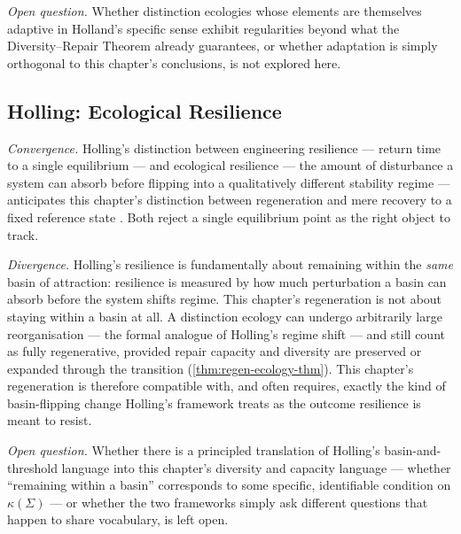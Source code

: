 \documentclass[12pt,twoside,openright]{book}
\begin{document}
\emph{Open question.} Whether distinction ecologies whose
elements are themselves adaptive in Holland's specific sense
exhibit regularities beyond what the Diversity--Repair Theorem
already guarantees, or whether adaptation is simply orthogonal
to this chapter's conclusions, is not explored here.

\subsection*{Holling: Ecological Resilience}

\emph{Convergence.} Holling's distinction between engineering
resilience --- return time to a single equilibrium --- and
ecological resilience --- the amount of disturbance a system
can absorb before flipping into a qualitatively different
stability regime --- anticipates this chapter's distinction
between regeneration and mere recovery to a fixed reference
state \parencite{holling1973}. Both reject a single equilibrium
point as the right object to track.

\emph{Divergence.} Holling's resilience is fundamentally about
remaining within the \emph{same} basin of attraction: resilience
is measured by how much perturbation a basin can absorb before
the system shifts regime. This chapter's regeneration is not
about staying within a basin at all. A distinction ecology can
undergo arbitrarily large reorganisation --- the formal analogue
of Holling's regime shift --- and still count as fully
regenerative, provided repair capacity and diversity are
preserved or expanded through the transition
(\cref{thm:regen-ecology-thm}). This chapter's regeneration is
therefore compatible with, and often requires, exactly the kind
of basin-flipping change Holling's framework treats as the
outcome resilience is meant to resist.

\emph{Open question.} Whether there is a principled translation
of Holling's basin-and-threshold language into this chapter's
diversity and capacity language --- whether ``remaining within a
basin'' corresponds to some specific, identifiable condition on
$\kappa(\Sigma)$ --- or whether the two frameworks simply ask
different questions that happen to share vocabulary, is left
open.
\end{document}
